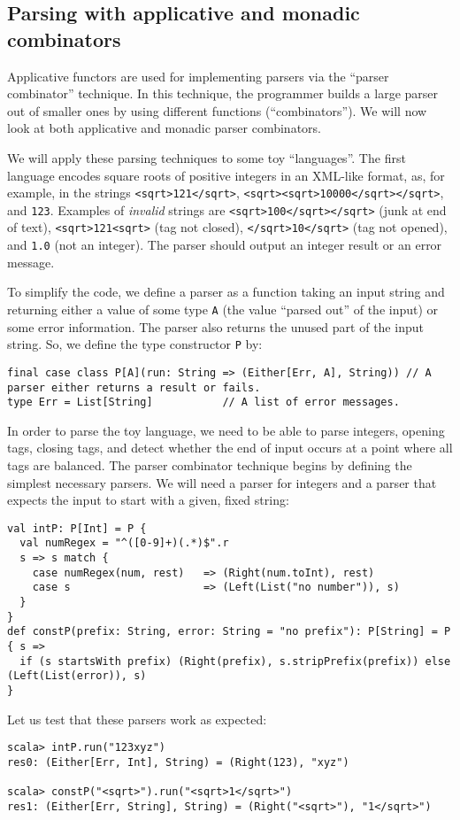 \subsection{Parsing with applicative and monadic combinators\label{subsec:Parsing-with-applicative-and-monadic-parsers}}

Applicative functors are used for implementing parsers via the \textsf{``}parser
combinator\textsf{''} technique. In this technique, the programmer builds
a large parser out of smaller ones by using different functions (\textsf{``}combinators\textsf{''}).
We will now look at both applicative and monadic parser combinators.

We will apply these parsing techniques to some toy \textsf{``}languages\textsf{''}.
The first language encodes square roots of positive integers in an
XML-like format, as, for example, in the strings \lstinline!<sqrt>121</sqrt>!,
\lstinline!<sqrt><sqrt>10000</sqrt></sqrt>!, and \lstinline!123!.
Examples of \emph{invalid} strings are \lstinline!<sqrt>100</sqrt></sqrt>!
(junk at end of text), \lstinline!<sqrt>121<sqrt>! (tag not closed),
\lstinline!</sqrt>10</sqrt>! (tag not opened), and \lstinline!1.0!
(not an integer). The parser should output an integer result or an
error message.

To simplify the code, we define a parser as a function taking an input
string and returning either a value of some type \lstinline!A! (the
value \textsf{``}parsed out\textsf{''} of the input) or some error information. The
parser also returns the unused part of the input string. So, we define
the type constructor \lstinline!P! by:
\begin{lstlisting}
final case class P[A](run: String => (Either[Err, A], String)) // A parser either returns a result or fails.
type Err = List[String]           // A list of error messages.
\end{lstlisting}

In order to parse the toy language, we need to be able to parse integers,
opening tags, closing tags, and detect whether the end of input occurs
at a point where all tags are balanced. The parser combinator technique
begins by defining the simplest necessary parsers. We will need a
parser for integers and a parser that expects the input to start with
a given, fixed string:
\begin{lstlisting}
val intP: P[Int] = P { 
  val numRegex = "^([0-9]+)(.*)$".r
  s => s match {
    case numRegex(num, rest)   => (Right(num.toInt), rest)
    case s                     => (Left(List("no number")), s)
  } 
}
def constP(prefix: String, error: String = "no prefix"): P[String] = P { s =>
  if (s startsWith prefix) (Right(prefix), s.stripPrefix(prefix)) else (Left(List(error)), s)
}
\end{lstlisting}
Let us test that these parsers work as expected:
\begin{lstlisting}
scala> intP.run("123xyz")
res0: (Either[Err, Int], String) = (Right(123), "xyz")

scala> constP("<sqrt>").run("<sqrt>1</sqrt>")
res1: (Either[Err, String], String) = (Right("<sqrt>"), "1</sqrt>")
\end{lstlisting}

